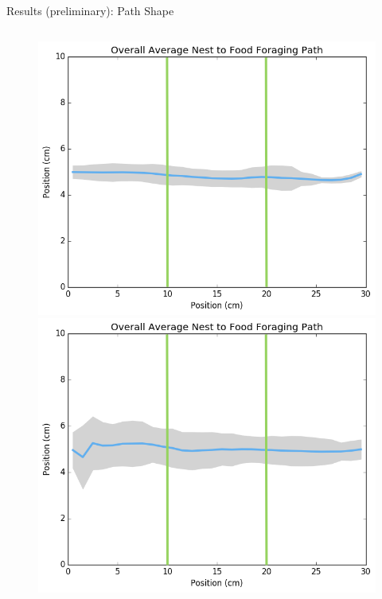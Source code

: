 \begin{frame}{Results (preliminary): Path Shape}
\begin{figure}
\begin{columns}[T,onlytextwidth]
\includegraphics[width=\textwidth]{results/center-to-center-average_path_negpidiv3.png}
\includegraphics[width=\textwidth]{results/center-to-center-average_path_0.png}

\end{columns}
\end{figure}
\end{frame}
